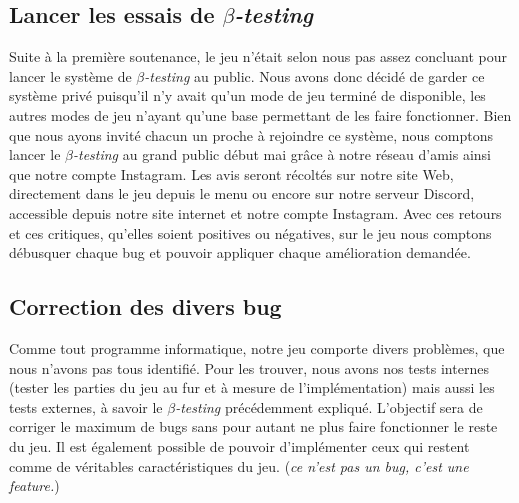 \documentclass[12pt,a4paper]{article}
\begin{document}
        \clearpage

        \subsection{Lancer les essais de \(\beta\)\textit{-testing}}
            Suite à la première soutenance, le jeu n'était selon nous pas assez concluant
            pour lancer le système de \(\beta\)\textit{-testing} au public. Nous avons donc
            décidé de garder ce système privé puisqu'il n'y avait qu'un mode de jeu terminé de
            disponible, les autres modes de jeu n'ayant qu'une base permettant de les faire fonctionner.
            Bien que nous ayons invité chacun un proche à rejoindre ce système, nous comptons lancer le
            \(\beta\)\textit{-testing} au grand public début mai grâce à notre réseau d'amis ainsi que
            notre compte Instagram. Les avis seront récoltés sur notre site Web, directement dans le jeu
            depuis le menu ou encore sur notre serveur Discord, accessible depuis notre site internet
            et notre compte Instagram. Avec ces retours et ces critiques, qu'elles soient positives ou négatives, sur le jeu nous comptons
            débusquer chaque bug et pouvoir appliquer chaque amélioration demandée.

        \subsection{Correction des divers bug}
            Comme tout programme informatique, notre jeu comporte divers problèmes, que nous n'avons pas
            tous identifié. Pour les trouver, nous avons nos tests internes (tester les parties du jeu
            au fur et à mesure de l'implémentation) mais aussi les tests externes, à savoir le
            \(\beta\)\textit{-testing} précédemment expliqué.
            L'objectif sera de corriger le maximum de bugs sans pour autant ne plus faire fonctionner le reste du jeu. Il est également possible de pouvoir d'implémenter ceux qui restent comme de véritables
            caractéristiques du jeu. (\textit{ce n'est pas un bug, c'est une feature.})


\end{document}
